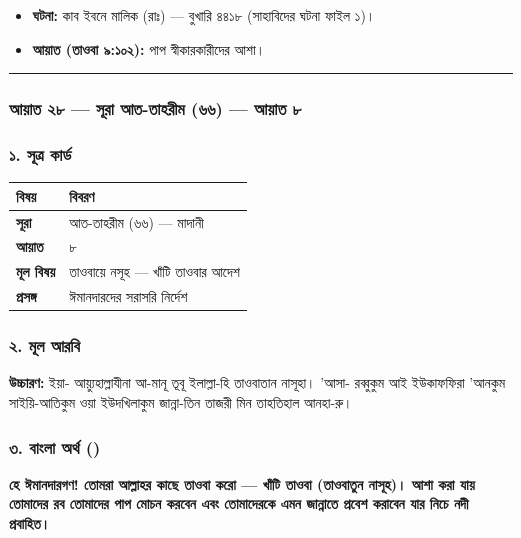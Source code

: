 \begin{itemize}
\item \textbf{ঘটনা:} কাব ইবনে মালিক (রাঃ) — বুখারি ৪৪১৮ (সাহাবিদের ঘটনা ফাইল ১)।
\item \textbf{আয়াত (তাওবা ৯:১০২):} পাপ স্বীকারকারীদের আশা।
\end{itemize}
\medskip\hrule\medskip

\subsubsection*{আয়াত ২৮ — সূরা আত-তাহরীম (৬৬) — আয়াত ৮}

\subsubsection*{১. সূত্র কার্ড}

\begin{table}[h]\centering\small
\begin{tabular}{ll}
বিষয় & বিবরণ \\
\hline
\textbf{সূরা} & আত-তাহরীম (৬৬) — মাদানী \\
\textbf{আয়াত} & ৮ \\
\textbf{মূল বিষয়} & তাওবায়ে নসূহ — খাঁটি তাওবার আদেশ \\
\textbf{প্রসঙ্গ} & ঈমানদারদের সরাসরি নির্দেশ \\
\hline
\end{tabular}
\end{table}

\subsubsection*{২. মূল আরবি}

\begin{center}\end{center}
\textbf{উচ্চারণ:} ইয়া- আয়্যুহাল্লাযীনা আ-মানূ তূবূ ইলাল্লা-হি তাওবাতান নাসূহা। 'আসা- রব্বুকুম আই ইউকাফফিরা 'আনকুম সাইয়ি-আতিকুম ওয়া ইউদখিলাকুম জান্না-তিন তাজরী মিন তাহতিহাল আনহা-রু।

\subsubsection*{৩. বাংলা অর্থ ()}

\textbf{হে ঈমানদারগণ! তোমরা আল্লাহর কাছে তাওবা করো — খাঁটি তাওবা (তাওবাতুন নাসূহ)। আশা করা যায় তোমাদের রব তোমাদের পাপ মোচন করবেন এবং তোমাদেরকে এমন জান্নাতে প্রবেশ করাবেন যার নিচে নদী প্রবাহিত।}

